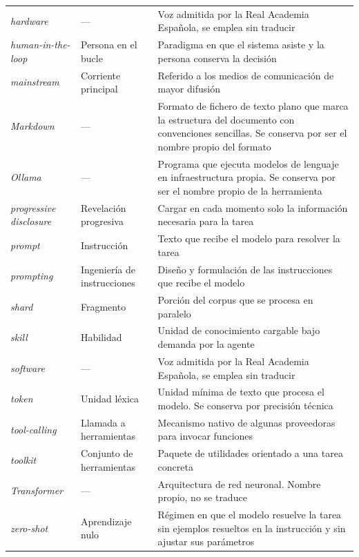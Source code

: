 \begin{table}[H]
{\begin{tabularx}{\textwidth}{
            >{\hsize=0.85\hsize\raggedright\arraybackslash}X
            >{\hsize=0.95\hsize\raggedright\arraybackslash}X
            >{\hsize=1.20\hsize\raggedright\arraybackslash}X
        }
            \textit{hardware} & --- & Voz admitida por la Real Academia Española, se emplea sin traducir \\
            \textit{human-in-the-loop} & Persona en el bucle & Paradigma en que el sistema asiste y la persona conserva la decisión \\
            \textit{mainstream} & Corriente principal & Referido a los medios de comunicación de mayor difusión \\
            \textit{Markdown} & --- & Formato de fichero de texto plano que marca la estructura del documento con convenciones sencillas. Se conserva por ser el nombre propio del formato \\
            \textit{Ollama} & --- & Programa que ejecuta modelos de lenguaje en infraestructura propia. Se conserva por ser el nombre propio de la herramienta \\
            \textit{progressive disclosure} & Revelación progresiva & Cargar en cada momento solo la información necesaria para la tarea \\
            \textit{prompt} & Instrucción & Texto que recibe el modelo para resolver la tarea \\
            \textit{prompting} & Ingeniería de instrucciones & Diseño y formulación de las instrucciones que recibe el modelo \\
            \textit{shard} & Fragmento & Porción del corpus que se procesa en paralelo \\
            \textit{skill} & Habilidad & Unidad de conocimiento cargable bajo demanda por la agente \\
            \textit{software} & --- & Voz admitida por la Real Academia Española, se emplea sin traducir \\
            \textit{token} & Unidad léxica & Unidad mínima de texto que procesa el modelo. Se conserva por precisión técnica \\
            \textit{tool-calling} & Llamada a herramientas & Mecanismo nativo de algunas proveedoras para invocar funciones \\
            \textit{toolkit} & Conjunto de herramientas & Paquete de utilidades orientado a una tarea concreta \\
            \textit{Transformer} & --- & Arquitectura de red neuronal. Nombre propio, no se traduce \\
            \textit{zero-shot} & Aprendizaje nulo & Régimen en que el modelo resuelve la tarea sin ejemplos resueltos en la instrucción y sin ajustar sus parámetros \\
            \bottomrule
        \end{tabularx}
    }
    \endgroup
\end{table}

